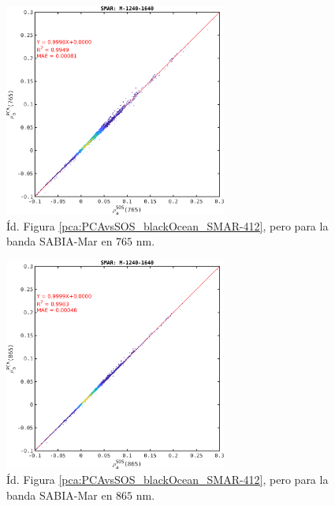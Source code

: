         \begin{figure}
        \centering
        \includegraphics[width=0.65\textwidth]{pca/figures/PCAvsSOS_blackOcean_SMAR-765.png}
        \caption[Reflectancia de aerosoles estimada por PCA vs. simulada para la banda de SABIA-Mar en $765$ nm.]{Íd. Figura \ref{pca:PCAvsSOS_blackOcean_SMAR-412}, pero para la banda SABIA-Mar en $765$ nm.}
        \label{pca:PCAvsSOS_blackOcean_SMAR-765}
        \end{figure}

        \begin{figure}
        \centering
        \includegraphics[width=0.65\textwidth]{pca/figures/PCAvsSOS_blackOcean_SMAR-865.png}
        \caption[Reflectancia de aerosoles estimada por PCA vs. simulada para la banda de SABIA-Mar en $865$ nm.]{Íd. Figura \ref{pca:PCAvsSOS_blackOcean_SMAR-412}, pero para la banda SABIA-Mar en $865$ nm.}
        \label{pca:PCAvsSOS_blackOcean_SMAR-865}
        \end{figure}

